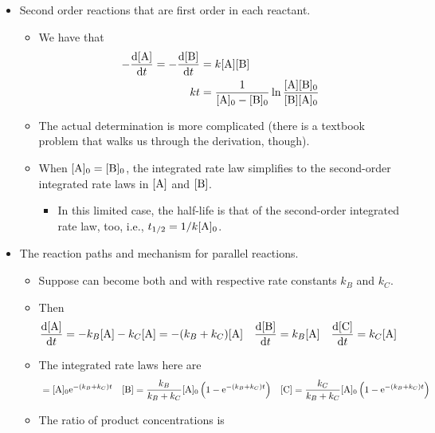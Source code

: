 \documentclass[../notes.tex]{subfiles}
\begin{document}
\begin{itemize}
\begin{itemize}
    \end{itemize}
    \item Second order reactions that are first order in each reactant.
    \begin{itemize}
        \item We have that
        \begin{align*}
            -\dv{[\ce{A}]}{t} = -\dv{[\ce{B}]}{t} &= k[\ce{A}][\ce{B}]\\
            kt &= \frac{1}{[\ce{A}]_0-[\ce{B}]_0}\ln\frac{[\ce{A}][\ce{B}]_0}{[\ce{B}][\ce{A}]_0}
        \end{align*}
        \item The actual determination is more complicated (there is a textbook problem that walks us through the derivation, though).
        \item When $[\ce{A}]_0=[\ce{B}]_0$, the integrated rate law simplifies to the second-order integrated rate laws in $[\ce{A}]$ and $[\ce{B}]$.
        \begin{itemize}
            \item In this limited case, the half-life is that of the second-order integrated rate law, too, i.e., $t_{1/2}=1/k[\ce{A}]_0$.
        \end{itemize}
    \end{itemize}
    \item The reaction paths and mechanism for parallel reactions.
    \begin{itemize}
        \item Suppose  can become both  and  with respective rate constants $k_B$ and $k_C$.
        \item Then
        \begin{align*}
            \dv{[\ce{A}]}{t} &= -k_B[\ce{A}]-k_C[\ce{A}] = -(k_B+k_C)[\ce{A}]&
            \dv{[\ce{B}]}{t} &= k_B[\ce{A}]&
            \dv{[\ce{C}]}{t} &= k_C[\ce{A}]
        \end{align*}
        \item The integrated rate laws here are
        \begin{align*}
            [\ce{A}] &= [\ce{A}]_0\e[-(k_B+k_C)t]&
            [\ce{B}] &= \frac{k_B}{k_B+k_C}[\ce{A}]_0\left( 1-\e[-(k_B+k_C)t] \right)&
            [\ce{C}] &= \frac{k_C}{k_B+k_C}[\ce{A}]_0\left( 1-\e[-(k_B+k_C)t] \right)
        \end{align*}
        \item The ratio of product concentrations is
        \begin{equation*}

\end{equation*}
\end{itemize}
\end{itemize}
\end{document}

